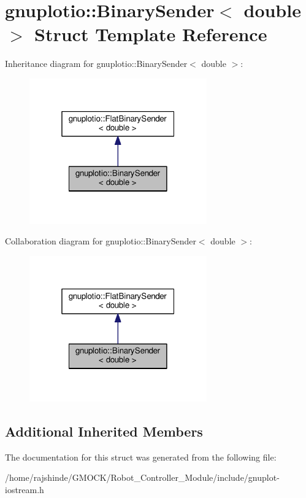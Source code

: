 \hypertarget{structgnuplotio_1_1_binary_sender_3_01double_01_4}{}\section{gnuplotio\+:\+:Binary\+Sender$<$ double $>$ Struct Template Reference}
\label{structgnuplotio_1_1_binary_sender_3_01double_01_4}


Inheritance diagram for gnuplotio\+:\+:Binary\+Sender$<$ double $>$\+:
\nopagebreak
\begin{figure}[H]
\begin{center}
\leavevmode
\includegraphics[width=217pt]{structgnuplotio_1_1_binary_sender_3_01double_01_4__inherit__graph}
\end{center}
\end{figure}


Collaboration diagram for gnuplotio\+:\+:Binary\+Sender$<$ double $>$\+:
\nopagebreak
\begin{figure}[H]
\begin{center}
\leavevmode
\includegraphics[width=217pt]{structgnuplotio_1_1_binary_sender_3_01double_01_4__coll__graph}
\end{center}
\end{figure}
\subsection*{Additional Inherited Members}


The documentation for this struct was generated from the following file\+:\begin{DoxyCompactItemize}
\item 
/home/rajshinde/\+G\+M\+O\+C\+K/\+Robot\+\_\+\+Controller\+\_\+\+Module/include/gnuplot-\/iostream.\+h\end{DoxyCompactItemize}
